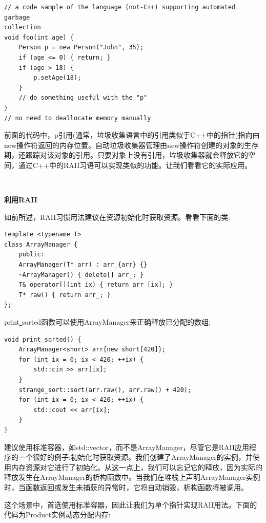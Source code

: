 \begin{lstlisting}[caption={}]
// a code sample of the language (not-C++) supporting automated garbage
collection
void foo(int age) {
	Person p = new Person("John", 35);
	if (age <= 0) { return; }
	if (age > 18) {
		p.setAge(18);
	}
	// do something useful with the "p"
}
// no need to deallocate memory manually
\end{lstlisting}

前面的代码中，p引用(通常，垃圾收集语言中的引用类似于C++中的指针)指向由new操作符返回的内存位置。自动垃圾收集器管理由new操作符创建的对象的生存期，还跟踪对该对象的引用。只要对象上没有引用，垃圾收集器就会释放它的空间，通过C++中的RAII习语可以实现类似的功能。让我们看看它的实际应用。 \par

\noindent\textbf{}\ \par
\textbf{利用RAII} \ \par
如前所述，RAII习惯用法建议在资源初始化时获取资源。看看下面的类: \par

\begin{lstlisting}[caption={}]
template <typename T>
class ArrayManager {
	public:
	ArrayManager(T* arr) : arr_{arr} {}
	~ArrayManager() { delete[] arr_; }
	T& operator[](int ix) { return arr_[ix]; }
	T* raw() { return arr_; }
};
\end{lstlisting}

print\underline{ }sorted函数可以使用ArrayManager来正确释放已分配的数组:\par

\begin{lstlisting}[caption={}]
void print_sorted() {
	ArrayManager<short> arr{new short[420]};
	for (int ix = 0; ix < 420; ++ix) {
		std::cin >> arr[ix];
	}
	strange_sort::sort(arr.raw(), arr.raw() + 420);
	for (int ix = 0; ix < 420; ++ix) {
		std::cout << arr[ix];
	}
}
\end{lstlisting}

建议使用标准容器，如std::vector，而不是ArrayManager，尽管它是RAII应用程序的一个很好的例子:初始化时获取资源。我们创建了ArrayManager的实例，并使用内存资源对它进行了初始化。从这一点上，我们可以忘记它的释放，因为实际的释放发生在ArrayManager的析构函数中。当我们在堆栈上声明ArrayManager实例时，当函数返回或发生未捕获的异常时，它将自动销毁，析构函数将被调用。 \par
这个场景中，首选使用标准容器，因此让我们为单个指针实现RAII用法。下面的代码为Product实例动态分配内存:\par

